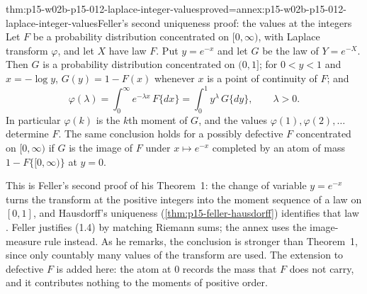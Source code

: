 \begin{hbtheorem}{thm:p15-w02b-p15-012-laplace-integer-values}{proved=annex:p15-w02b-p15-012-laplace-integer-values}{Feller's second uniqueness proof: the values at the integers}
Let \(F\) be a probability distribution concentrated on \([0,\infty)\), with
Laplace transform \(\varphi\), and let \(X\) have law \(F\). Put \(y=e^{-x}\)
and let \(G\) be the law of \(Y=e^{-X}\). Then \(G\) is a probability
distribution concentrated on \((0,1]\); for \(0<y<1\) and \(x=-\log y\),
\(G(y)=1-F(x)\) whenever \(x\) is a point of continuity of \(F\); and
\[
 \varphi(\lambda)=\int_0^\infty e^{-\lambda x}\,F\{dx\}=\int_0^1y^\lambda\,G\{dy\},
 \qquad\lambda>0.
 \tag{1.4}
\]
In particular \(\varphi(k)\) is the \(k\)th moment of \(G\), and the values
\(\varphi(1),\varphi(2),\ldots\) determine \(F\). The same conclusion holds for
a possibly defective \(F\) concentrated on \([0,\infty)\) if \(G\) is the image
of \(F\) under \(x\mapsto e^{-x}\) completed by an atom of mass
\(1-F\{[0,\infty)\}\) at \(y=0\).
\end{hbtheorem}

This is Feller's second proof of his Theorem~1: the change of variable
\(y=e^{-x}\) turns the transform at the positive integers into the moment
sequence of a law on \([0,1]\), and Hausdorff's uniqueness
(\cref{thm:p15-feller-hausdorff}) identifies that law
\cite[vol.~II, XIII.1, p.~430]{Feller1971ProbabilityII}. Feller justifies
(1.4) by matching Riemann sums; the annex uses the image-measure rule instead.
As he remarks, the conclusion is stronger than Theorem~1, since only countably
many values of the transform are used. The extension to defective \(F\) is
added here: the atom at \(0\) records the mass that \(F\) does not carry, and
it contributes nothing to the moments of positive order.

